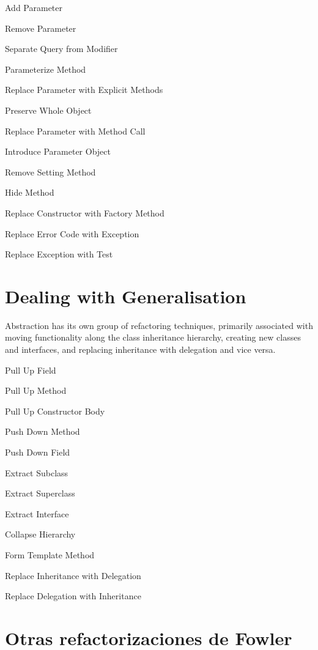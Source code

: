 \documentclass[11pt,a4paper,oneside]{book}
\begin{document}
     
    
    Add Parameter
    
    Remove Parameter
    
    Separate Query from Modifier
    
    Parameterize Method
    
    Replace Parameter with Explicit Methods
    
    Preserve Whole Object
    
    Replace Parameter with Method Call
    
    Introduce Parameter Object
    
    Remove Setting Method
    
    Hide Method
    
    Replace Constructor with Factory Method
    
    Replace Error Code with Exception
    
    Replace Exception with Test




\section{Dealing with Generalisation}

Abstraction has its own group of refactoring techniques, primarily associated with moving functionality along the class inheritance hierarchy, creating new classes and interfaces, and replacing inheritance with delegation and vice versa.

    Pull Up Field
    
    Pull Up Method
    
    Pull Up Constructor Body
    
    Push Down Method
    
    Push Down Field
    
    Extract Subclass
    
    Extract Superclass
    
    Extract Interface
    
    Collapse Hierarchy
    
    Form Template Method
    
    Replace Inheritance with Delegation
    
    Replace Delegation with Inheritance


\section{Otras refactorizaciones de Fowler}
\end{document}
